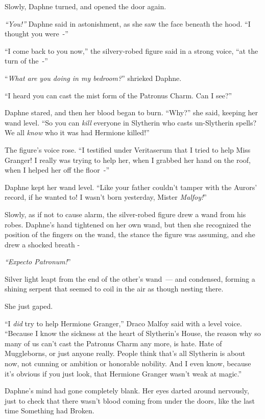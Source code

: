 Slowly, Daphne turned, and opened the door again.

\emph{``You!''} Daphne said in astonishment, as she saw the face beneath the hood. ``I thought you were~-''

``I come back to you now,'' the silvery-robed figure said in a strong voice, ``at the turn of the~-''

``\emph{What are you doing in my bedroom?}'' shrieked Daphne.

``I heard you can cast the mist form of the Patronus Charm. Can I see?''

Daphne stared, and then her blood began to burn. ``Why?'' she said, keeping her wand level. ``So you can \emph{kill} everyone in Slytherin who casts un-Slytherin spells? We all \emph{know} who it was had Hermione killed!''

The figure's voice rose. ``I testified under Veritaserum that I tried to help Miss Granger! I really was trying to help her, when I grabbed her hand on the roof, when I helped her off the floor~-''

Daphne kept her wand level. ``Like your father couldn't tamper with the Aurors' record, if he wanted to! I wasn't born yesterday, Mister \emph{Malfoy!}''

Slowly, as if not to cause alarm, the silver-robed figure drew a wand from his robes. Daphne's hand tightened on her own wand, but then she recognized the position of the fingers on the wand, the stance the figure was assuming, and she drew a shocked breath -

\emph{``Expecto Patronum!}''

Silver light leapt from the end of the other's wand~--- and condensed, forming a shining serpent that seemed to coil in the air as though nesting there.

She just gaped.

``I \emph{did} try to help Hermione Granger,'' Draco Malfoy said with a level voice. ``Because I know the sickness at the heart of Slytherin's House, the reason why so many of us can't cast the Patronus Charm any more, is hate. Hate of Muggleborns, or just anyone really. People think that's all Slytherin is about now, not cunning or ambition or honorable nobility. And I even know, because it's obvious if you just look, that Hermione Granger wasn't weak at magic.''

Daphne's mind had gone completely blank. Her eyes darted around nervously, just to check that there wasn't blood coming from under the doors, like the last time Something had Broken.

